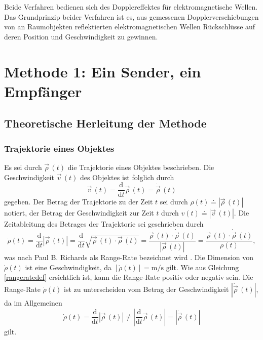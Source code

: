\documentclass[a4paper,12pt]{article}
\numberwithin{equation}{section}
\begin{document}
Beide Verfahren bedienen sich des Dopplereffektes für elektromagnetische Wellen. Das Grundprinzip beider Verfahren ist es, aus gemessenen Dopplerverschiebungen von an Raumobjekten reflektierten elektromagnetischen Wellen Rückschlüsse auf deren Position und Geschwindigkeit zu gewinnen.

\newpage
\section{Methode 1: Ein Sender, ein Empfänger}

\subsection{Theoretische Herleitung der Methode}
\subsubsection{Trajektorie eines Objektes}
Es sei durch $\vec{\rho}\,(t)$ die Trajektorie eines Objektes beschrieben. Die Geschwindigkeit $\vec{v}\,(t)$ des Objektes ist folglich durch \begin{equation}
\vec{v}\,(t) = \frac{\mathrm{d}}{\mathrm{d}t}\vec{\rho}\,(t) = \dot{\vec{\rho}}\,(t)
\end{equation} gegeben. Der Betrag der Trajektorie zu der Zeit $t$ sei durch $\rho(t) \doteq |\vec{\rho}\,(t)|$ notiert, der Betrag der Geschwindigkeit zur Zeit $t$ durch $v(t) \doteq |\vec{v}\,(t)|$. Die Zeitableitung des Betrages der Trajektorie sei geschrieben durch \begin{equation}\label{rangeratedef}
\dot{\rho}(t) = \frac{\mathrm{d}}{\mathrm{d}t}|\vec{\rho}\,(t)| = \frac{\mathrm{d}}{\mathrm{d}t} \sqrt{\vec{\rho}\,(t) \cdot \vec{\rho}\,(t)} = \frac{\vec{\rho}\,(t)\cdot \dot{\vec{\rho}}\,(t)}{|\vec{\rho}\,(t)|} = \frac{\vec{\rho}\,(t)\cdot \dot{\vec{\rho}}\,(t)}{\rho(t)} ,
\end{equation} was nach Paul B. Richards als Range-Rate bezeichnet wird \cite[S.1729]{Richards.1961}. Die Dimension von $\dot{\rho}(t)$ ist eine Geschwindigkeit, da $[\dot{\rho}(t)] = \si{\meter\per\second}$ gilt. Wie aus Gleichung \eqref{rangeratedef} ersichtlich ist, kann die Range-Rate positiv oder negativ sein. Die Range-Rate $\dot{\rho}(t)$ ist zu unterscheiden vom Betrag der Geschwindigkeit $|\dot{\vec{\rho}}\,(t)|$, da im Allgemeinen \begin{equation}
\dot{\rho}(t) = \frac{\mathrm{d}}{\mathrm{d}t}|\vec{\rho}\,(t)| \neq |\frac{\mathrm{d}}{\mathrm{d}t}\vec{\rho}\,(t)| = |\dot{\vec{\rho}}\,(t)|
\end{equation} gilt.
\end{document}
